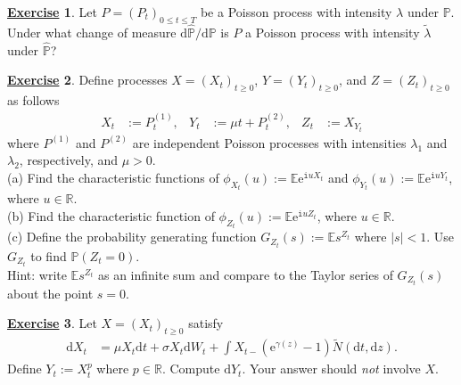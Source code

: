 \documentclass[12pt]{book}
\numberwithin{equation}{chapter}
\theoremstyle{plain}
\numberwithin{theorem}{section}
\theoremstyle{definition}
\newtheorem{exercise}{\underline{Exercise}}
\numberwithin{exercise}{chapter}
\newcommand{\<}{\langle}
\renewcommand{\>}{\rangle}
\renewcommand{\(}{\left(}
\renewcommand{\)}{\right)}
\renewcommand{\[}{\left[}
\renewcommand{\]}{\right]}
\newcommand\Eb{\mathds{E}}
\newcommand\Pb{\mathds{P}}
\newcommand\Rb{\mathds{R}}
\newcommand\sig{\sigma}
\newcommand\gam{\gamma}
\newcommand\lam{\lambda}
\newcommand\Pbh{\widehat{\Pb}}
\newcommand\Nt{\widetilde{N}}
\newcommand\ii{\mathtt{i}}
\newcommand\dd{\mathrm{d}}
\newcommand\ee{\mathrm{e}}
\begin{document}
\begin{exercise}
\label{exer:10.7}
Let $P = (P_t)_{0 \leq t \leq T}$ be a Poisson process with intensity $\lam$ under $\Pb$.  Under what change of measure $\dd \Pbh / \dd \Pb$ is $P$ a Poisson process with intensity $\widetilde{\lam}$ under $\Pbh$?
\end{exercise}

\begin{exercise}
\label{exer:10.8}
Define processes $X=(X_t)_{t \geq 0}$, $Y=(Y_t)_{t \geq 0}$, and $Z=(Z_t)_{t \geq 0}$ as follows
\begin{align}
X_t 
	&:= P_t^{(1)} , &
Y_t 
	&:= \mu t + P_t^{(2)} , &
Z_t 
	&:= X_{Y_t} 
\end{align}
where $P^{(1)}$ and $P^{(2)}$ are independent Poisson processes with intensities $\lambda_1$ and $\lambda_2$, respectively, and $\mu > 0$.
\\[0.5em]
(a) Find the characteristic functions of $\phi_{X_t}(u) := \Eb \ee^{\ii u X_t}$ and $\phi_{Y_t}(u) := \Eb \ee^{\ii u Y_t}$, where $u \in \Rb$.
\\[0.5em]
(b) Find the characteristic function of $\phi_{Z_t}(u) := \Eb \ee^{\ii u Z_t}$, where $u \in \Rb$. 
\\[0.5em]
(c) Define the probability generating function $G_{Z_t}(s) := \Eb s^{Z_t}$ where $|s|< 1$.  Use $G_{Z_t}$ to find $\Pb( Z_t = 0)$.
\\[0.5em]
Hint: write $\Eb s^{Z_t}$ as an infinite sum and compare to the Taylor series of $G_{Z_t}(s)$ about the point $s=0$.
\end{exercise}

\begin{exercise}
\label{exer:10.9}
Let $X = (X_t)_{t \geq 0}$ satisfy
\begin{align}
\dd X_t
	&=	\mu X_t \dd t + \sig X_t \dd W_t + \int X_{t-} (\ee^{\gam(z)}-1) \Nt(\dd t, \dd z) .
\end{align}
Define $Y_t := X_t^p$ where $p \in \Rb$.  Compute $\dd Y_t$.  Your answer should \textit{not} involve $X$.
\end{exercise}
\end{document}
